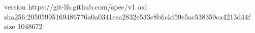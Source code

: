 version https://git-lfs.github.com/spec/v1
oid sha256:20505995169486776a0a0341eea2832e533c8bfa4d59e5ac538359ca4213d44f
size 1048672
